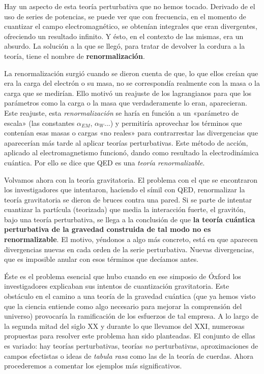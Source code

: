 \documentclass[11pt,a4paper,titlepage]{article}
\begin{document}
Hay un aspecto de esta teoría perturbativa que no hemos tocado. Derivado de el uso de series de potencias, se puede ver que con frecuencia, en el momento de cuantizar el campo electromagnético, se obtenían integrales que eran divergentes, ofreciendo un resultado infinito. Y ésto, en el contexto de las mismas, era un absurdo. La solución a la que se llegó, para tratar de devolver la cordura a la teoría, tiene el nombre de \textbf{renormalización}.

La renormalización surgió cuando se dieron cuenta de que, lo que ellos creían que era la carga del electrón o su masa, no se correspondía realmente con la masa o la carga que se medirían. Ello motivó un reajuste de los lagrangianos para que los parámetros como la carga o la masa que verdaderamente lo eran, aparecieran. Este reajuste, esta \textit{renormalización} se haría en función a un «parámetro de escala» (las constantes $\alpha_{EM}$, $\alpha_W$...) y permitiría aprovechar los términos que contenían esas masas o cargas «no reales» para contrarrestar las divergencias que aparecerían más tarde al aplicar teorías perturbativas. Este método de acción, aplicado al electromagnetismo funcionó, dando como resultado la electrodinámica cuántica. Por ello se dice que QED es una \textit{teoría renormalizable}.

Volvamos ahora con la teoría gravitatoria. El problema con el que se encontraron los investigadores que intentaron, haciendo el símil con QED, renormalizar la teoría gravitatoria se dieron de bruces contra una pared. Si se parte de intentar cuantizar la partícula (teorizada) que media la interacción fuerte, el gravitón, bajo una teoría perturbativa, se llega a la conclusión de que \textbf{la teoría cuántica perturbativa de la gravedad construida de tal modo no es renormalizable}. El motivo, yéndonos a algo más concreto, está en que aparecen divergencias nuevas en cada orden de la serie perturbativa. Nuevas divergencias, que es imposible anular con esos términos que decíamos antes.

Éste es el problema esencial que hubo cuando en ese simposio de Óxford los investigadores explicaban sus intentos de cuantización gravitatoria. Este obstáculo en el camino a una teoría de la gravedad cuántica (que ya hemos visto que la ciencia entiende como algo necesario para mejorar la comprensión del universo) provocaría la ramificación de los esfuerzos de tal empresa. A lo largo de la segunda mitad del siglo XX y durante lo que llevamos del XXI, numerosas propuestas para resolver este problema han sido planteadas. El conjunto de ellas es variado: hay teorías perturbativas, teorías \textit{no} perturbativas, aproximaciones de campos efectistas o ideas de \textit{tabula rasa} como las de la teoría de cuerdas. Ahora procederemos a comentar los ejemplos más significativos.
%
%
%
%
\newpage
\end{document}
